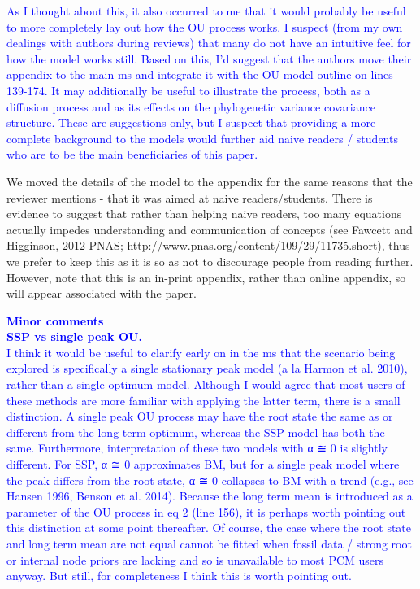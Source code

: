 \documentclass[12pt]{letter}
\begin{document}
\begin{letter}{}

\textcolor{blue}{As I thought about this, it also occurred to me that it would probably be useful to more completely lay out how the OU process works. I suspect (from my own dealings with authors during reviews) that many do not have an intuitive feel for how the model works still. Based on this, I'd suggest that the authors move their appendix to the main ms and integrate it with the OU model outline on lines 139-174. It may additionally be useful to illustrate the process, both as a diffusion process and as its effects on the phylogenetic variance covariance structure. These are suggestions only, but I suspect that providing a more complete background to the models would further aid naive readers / students who are to be the main beneficiaries of this paper.}

We moved the details of the model to the appendix for the same reasons that the reviewer mentions - that it was aimed at naive readers/students. There is evidence to suggest that rather than helping naive readers, too many equations actually impedes understanding and communication of concepts (see Fawcett and Higginson, 2012 PNAS; http://www.pnas.org/content/109/29/11735.short), thus we prefer to keep this as it is so as not to discourage people from reading further. However, note that this is an in-print appendix, rather than online appendix, so will appear associated with the paper.


\textcolor{blue}{\textbf{Minor comments}\\
\textbf{SSP vs single peak OU.}\\
I think it would be useful to clarify early on in the ms that the scenario being explored is specifically a single stationary peak model (a la Harmon et al. 2010), rather than a single optimum model. Although I would agree that most users of these methods are more familiar with applying the latter term, there is a small distinction. A single peak OU process may have the root state the same as or different from the long term optimum, whereas the SSP model has both the same. Furthermore, interpretation of these two models with α ≅ 0 is slightly different. For SSP, α ≅ 0 approximates BM, but for a single peak model where the peak differs from the root state, α ≅ 0 collapses to BM with a trend (e.g., see Hansen 1996, Benson et al. 2014). Because the long term mean is introduced as a parameter of the OU process in eq 2 (line 156), it is perhaps worth pointing out this distinction at some point thereafter. Of course, the case where the root state and long term mean are not equal cannot be fitted when fossil data / strong root or internal node priors are lacking and so is unavailable to most PCM users anyway. But still, for completeness I think this is worth pointing out.}


\end{letter}
\end{document}
